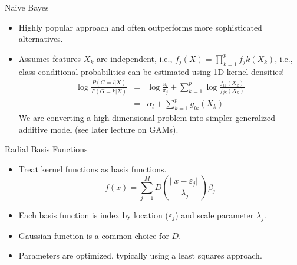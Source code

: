 \documentclass[aspectratio=169]{beamer}
\begin{document}
\begin{frame}{Naive Bayes}
    \begin{itemize}
        \item Highly popular approach and often outperforms more sophisticated alternatives.
        \item Assumes features $X_k$ are independent, i.e., $f_j(X) = \prod_{k=1}^p f_jk(X_k)$, i.e., class conditional probabilities can be estimated using 1D kernel densities!
        \begin{eqnarray*}
        \log{\frac{P(G=l|X)}{P(G=k|X)}} & = & \log{\frac{\pi_l}{\pi_j}} + \sum_{k=1}^p \log{\frac{f_{lk}(X_k)}{f_{jk}(X_k)}}\\
        & = & \alpha_l + \sum_{k=1}^p g_{lk}(X_k)
        \end{eqnarray*}
        We are converting a high-dimensional problem into simpler generalized additive model (see later lecture on GAMs). 
    \end{itemize}
\end{frame}


\begin{frame}{Radial Basis Functions}
    \begin{itemize}
        \item Treat kernel functions as basis functions.
        \begin{equation*}
            f(x) = \sum_{j=1}^M D(\frac{||x-\varepsilon_j||}{\lambda_j})\beta_j
        \end{equation*}
        \item Each basis function is index by location ($\varepsilon_j$) and scale parameter $\lambda_j$.
        \item Gaussian function is a common choice for $D$.
        \item Parameters are optimized, typically using a least squares approach.
    \end{itemize}
\end{frame}
\end{document}
